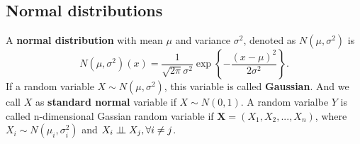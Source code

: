 \subsection{Normal distributions}
\begin{definition}
A \textbf{normal distribution} with mean $\mu$ and variance $\sigma^2$, denoted as $N(\mu,\sigma^2)$ is 
\begin{equation}
N(\mu,\sigma^2)(x) = \frac{1}{\sqrt{2\pi}\sigma^2}\exp\left\{-\frac{(x-\mu)^2}{2\sigma^2}\right\}.
\end{equation}
If a random variable $X\sim N(\mu,\sigma^2)$, this variable is called \textbf{Gaussian}. And we call $X$ as \textbf{standard normal} variable if $X\sim N(0,1)$.
A random varialbe $Y$ is called n-dimensional Gassian random variable if $\boldsymbol{X}=(X_1,X_2,...,X_n)$, where $X_i\sim N(\mu_i,\sigma_i^2)$ and $X_i\perp\!\!\!\perp X_j,\forall i\ne j$.
\end{definition}

